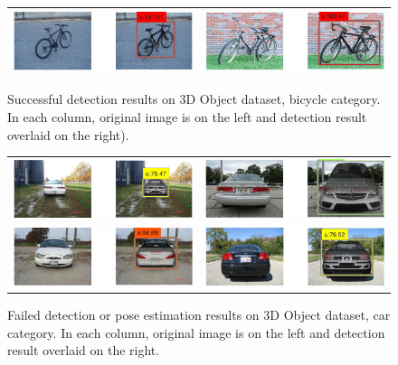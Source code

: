 \documentclass[10pt,twocolumn,letterpaper]{article}
\begin{document}
\begin{figure}[h]
\begin{tabular}{|c|c|}
  \includegraphics[width=0.40\linewidth]{supp/bicycle15.png} &
  \includegraphics[width=0.40\linewidth]{supp/bicycle10.png} \\
  \hline
  \end{tabular}
\caption{Successful detection results on 3D Object dataset, bicycle
category. In each column, original image is on the left and detection result overlaid on
the right).}%
  \label{fig:3dobject_bicycle_good}
\end{figure}

\begin{figure}[h]
\setlength\tabcolsep{1pt}
\centering
\begin{tabular}{|c|c|}
  \hline
  \includegraphics[width=0.40\linewidth]{supp/car13.png} &
  \includegraphics[width=0.40\linewidth]{supp/car30.png} \\ 
  \includegraphics[width=0.40\linewidth]{supp/car18.png} &
  \includegraphics[width=0.40\linewidth]{supp/car25.png} \\
  \hline
  \end{tabular}
\caption{Failed detection or pose estimation results on 3D Object dataset, car
category. In each column, original image is on the left and detection result overlaid
on the right.}%
  \label{fig:3dobject_car_bad}
\end{figure}
\end{document}
